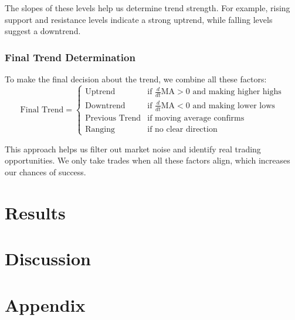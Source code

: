 \documentclass[12pt]{article}
\begin{document}
The slopes of these levels help us determine trend strength. For example, rising support and resistance levels indicate a strong uptrend, while falling levels suggest a downtrend.

\subsubsection*{Final Trend Determination}
To make the final decision about the trend, we combine all these factors:
\begin{equation*}
\text{Final Trend} = \begin{cases}
    \text{Uptrend} & \text{if } \frac{d}{dt}\text{MA} > 0 \text{ and making higher highs} \\
    \text{Downtrend} & \text{if } \frac{d}{dt}\text{MA} < 0 \text{ and making lower lows} \\
    \text{Previous Trend} & \text{if moving average confirms} \\
    \text{Ranging} & \text{if no clear direction}
\end{cases}
\end{equation*}

This approach helps us filter out market noise and identify real trading opportunities. We only take trades when all these factors align, which increases our chances of success.





\newpage
\section{Results}

\newpage
\section{Discussion}


\newpage
\section{Appendix}
\end{document}
